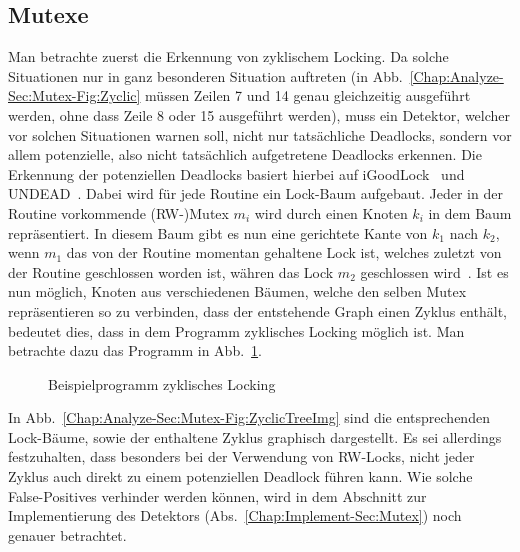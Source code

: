 \subsection{Mutexe}
Man betrachte zuerst die Erkennung von zyklischem Locking. 
Da solche Situationen nur in ganz besonderen Situation auftreten 
(in Abb.~\ref{Chap:Analyze-Sec:Mutex-Fig:Zyclic} müssen Zeilen 
7 und 14 genau gleichzeitig ausgeführt werden, ohne dass Zeile 8 oder 15 ausgeführt werden), muss 
ein Detektor, welcher vor solchen Situationen warnen soll, nicht nur tatsächliche Deadlocks, sondern
vor allem potenzielle, also nicht tatsächlich aufgetretene Deadlocks erkennen. Die Erkennung der 
potenziellen Deadlocks basiert hierbei auf iGoodLock~\cite{iGoodLock} und UNDEAD~\cite{Undead}. 
Dabei wird für jede Routine ein Lock-Baum aufgebaut. Jeder in der Routine vorkommende 
(RW-)Mutex $m_i$ wird durch einen Knoten $k_i$ in dem Baum repräsentiert. 
In diesem Baum gibt es nun eine gerichtete Kante von $k_1$ nach $k_2$, wenn 
$m_1$ das
von der Routine momentan gehaltene Lock ist, welches zuletzt von der Routine 
geschlossen worden ist, währen das Lock $m_2$ geschlossen wird~\cite{lock-tree}.
Ist es nun möglich, Knoten aus verschiedenen Bäumen, welche den selben
Mutex repräsentieren so zu verbinden, dass der entstehende Graph einen Zyklus 
enthält, bedeutet dies, dass in dem Programm zyklisches Locking möglich ist. 
Man betrachte dazu das Programm in Abb.~\ref{Chap:Analyze-Sec:Mutex-Fig:ZyclicTreeCode}.
\begin{figure}[h!]
  
  \caption{Beispielprogramm zyklisches Locking}
  \label{Chap:Analyze-Sec:Mutex-Fig:ZyclicTreeCode}
\end{figure}
In Abb.~\ref{Chap:Analyze-Sec:Mutex-Fig:ZyclicTreeImg} sind die entsprechenden
Lock-Bäume, sowie der enthaltene Zyklus graphisch dargestellt. Es sei allerdings 
festzuhalten, dass besonders bei der Verwendung von RW-Locks, nicht jeder 
Zyklus auch direkt zu einem potenziellen Deadlock führen kann. Wie solche 
False-Positives verhinder werden können, wird in dem Abschnitt zur Implementierung
des Detektors (Abs.~\ref{Chap:Implement-Sec:Mutex}) noch genauer betrachtet.

